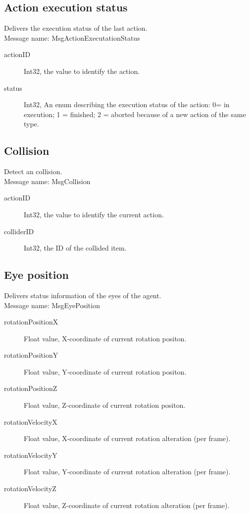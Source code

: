 \documentclass[a4paper,10pt]{scrartcl}
\begin{document}
\subsection{Action execution status}
Delivers the execution status of the last action.\\
Message name: MsgActionExecutationStatus
\begin{description}
 \item [actionID] Int32, the value to identify the action.
 \item [status] Int32, An enum describing the execution status of the action: 0= in execution; 1 = finished; 2 = aborted because of a new action of the same type.
\end{description}

\subsection{Collision}
Detect an collision.\\
Message name: MsgCollision
\begin{description}
 \item [actionID] Int32, the value to identify the current action.
 \item [colliderID] Int32, the ID of the collided item.
\end{description}

\subsection{Eye position}
Delivers status information of the eyes of the agent.\\
Message name: MsgEyePosition
\begin{description}
 \item [rotationPositionX] Float value, X-coordinate of current rotation positon.
 \item [rotationPositionY] Float value, Y-coordinate of current rotation positon.
 \item [rotationPositionZ] Float value, Z-coordinate of current rotation positon.
 \item [rotationVelocityX] Float value, X-coordinate of current rotation alteration (per frame).
 \item [rotationVelocityY] Float value, Y-coordinate of current rotation alteration (per frame).
 \item [rotationVelocityZ] Float value, Z-coordinate of current rotation alteration (per frame).
\end{description}
\end{document}
